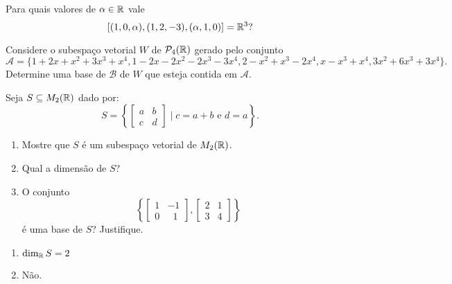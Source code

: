\documentclass[12pt]{exam}
\begin{document}
    \begin{exercicio}
        Para quais valores de $\alpha \in \mathbb{R}$ vale
        \[
            [(1, 0, \alpha), (1, 2, -3) , (\alpha, 1, 0)] = \mathbb{R}^3?
        \]
    \end{exercicio}

    \begin{exercicio}
        Considere o subespa\c{c}o vetorial $W$ de $\mathcal{P}_4(\mathbb{R})$ gerado pelo conjunto
        \[
            \mathcal{A} = \{1+2x+x^2+3x^3+x^4, 1-2x-2x^2-2x^3-3x^4,2-x^2+x^3-2x^4,x-x^3+x^4,3x^2+6x^3+3x^4\}.
        \]
        Determine uma base de $\mathcal{B}$ de $W$ que esteja contida em $\mathcal{A}$.
    \end{exercicio}

    \begin{exercicio}
        Seja $S \subseteq M_2(\mathbb{R})$ dado por:
        \[
            S = \left\{
                \begin{bmatrix}
                    a & b\\
                    c & d
                \end{bmatrix}
                \mid c = a+b \mbox{ e } d = a
            \right\}.
        \]

        \begin{enumerate}[label={\alph*})]
            \item Mostre que $S$ \'e um subespa\c{c}o vetorial de $M_2(\mathbb{R})$.

            \item Qual a dimens\~ao de $S$?

            \item O conjunto
                \[
                    \left\{
                        \begin{bmatrix}
                            1 & -1\\
                            0 & \phantom{x} 1
                        \end{bmatrix},
                        \begin{bmatrix}
                            2 & 1\\
                            3 & 4
                        \end{bmatrix}
                    \right\}
                \]
                \'e uma base de $S$? Justifique.
        \end{enumerate}

        \begin{solucao}
            \begin{enumerate}[label={\alph*})]
                \item $\dim_{\mathbb{R}} S = 2$

                \item N\~ao.
            \end{enumerate}
        \end{solucao}
    \end{exercicio}
\end{document}
